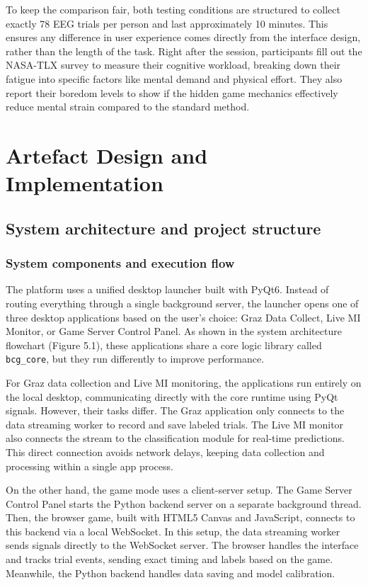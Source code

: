 \documentclass[a4paper, 11pt, openany]{report}
\begin{document}
    To keep the comparison fair, both testing conditions are structured to collect exactly 78 EEG trials per person and last approximately 10 minutes. This ensures any difference in user experience comes directly from the interface design, rather than the length of the task. Right after the session, participants fill out the NASA-TLX survey to measure their cognitive workload, breaking down their fatigue into specific factors like mental demand and physical effort. They also report their boredom levels to show if the hidden game mechanics effectively reduce mental strain compared to the standard method.

\chapter{Artefact Design and Implementation}

    \section{System architecture and project structure}

    \subsection{System components and execution flow}

    The platform uses a unified desktop launcher built with PyQt6. Instead of routing everything through a single background server, the launcher opens one of three desktop applications based on the user's choice: Graz Data Collect, Live MI Monitor, or Game Server Control Panel. As shown in the system architecture flowchart (Figure 5.1), these applications share a core logic library called \texttt{bcg\_core}, but they run differently to improve performance.

    For Graz data collection and Live MI monitoring, the applications run entirely on the local desktop, communicating directly with the core runtime using PyQt signals. However, their tasks differ. The Graz application only connects to the data streaming worker to record and save labeled trials. The Live MI monitor also connects the stream to the classification module for real-time predictions. This direct connection avoids network delays, keeping data collection and processing within a single app process.

    On the other hand, the game mode uses a client-server setup. The Game Server Control Panel starts the Python backend server on a separate background thread. Then, the browser game, built with HTML5 Canvas and JavaScript, connects to this backend via a local WebSocket. In this setup, the data streaming worker sends signals directly to the WebSocket server. The browser handles the interface and tracks trial events, sending exact timing and labels based on the game. Meanwhile, the Python backend handles data saving and model calibration.
\end{document}
